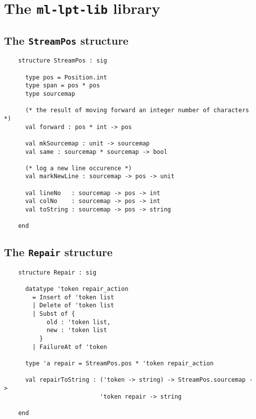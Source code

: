 \chapter{The {\tt ml-lpt-lib} library}\label{ch:ml-lpt-lib}



\section{The {\tt StreamPos} structure}

\begin{verbatim}
    structure StreamPos : sig

      type pos = Position.int
      type span = pos * pos
      type sourcemap

      (* the result of moving forward an integer number of characters *)
      val forward : pos * int -> pos

      val mkSourcemap : unit -> sourcemap
      val same : sourcemap * sourcemap -> bool

      (* log a new line occurence *)
      val markNewLine : sourcemap -> pos -> unit

      val lineNo   : sourcemap -> pos -> int
      val colNo    : sourcemap -> pos -> int
      val toString : sourcemap -> pos -> string

    end
\end{verbatim}


\section{The {\tt Repair} structure}

\begin{verbatim}
    structure Repair : sig

      datatype 'token repair_action
        = Insert of 'token list
        | Delete of 'token list
        | Subst of {
            old : 'token list,
            new : 'token list
          }
        | FailureAt of 'token
      
      type 'a repair = StreamPos.pos * 'token repair_action
      
      val repairToString : ('token -> string) -> StreamPos.sourcemap -> 
                           'token repair -> string
        
    end
\end{verbatim}
